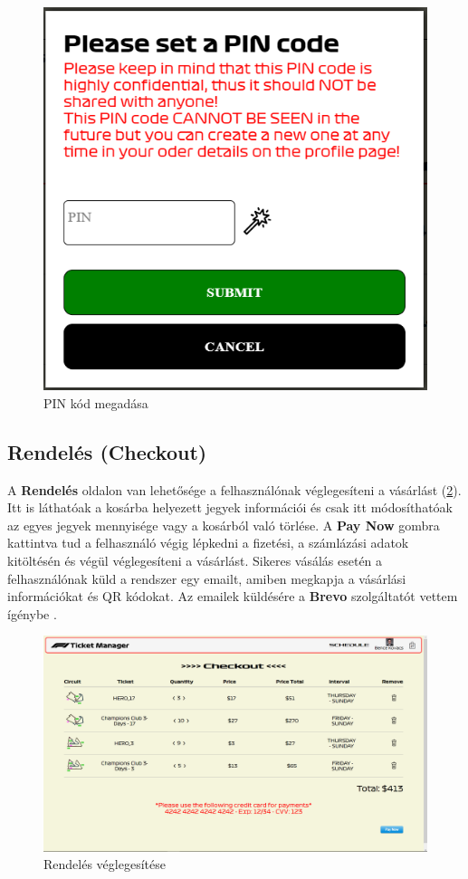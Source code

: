 \begin{figure}[!h]
	\centering
	\includegraphics[scale=0.4]{images/pinPopup}
	\caption{PIN kód megadása}
	\label{abra:pinPopup}
\end{figure}
\pagebreak

\subsection {Rendelés (Checkout)}

A \textbf{Rendelés} oldalon van lehetősége a felhasználónak véglegesíteni a vásárlást (\ref{abra:checkout}). Itt is láthatóak a kosárba helyezett jegyek információi és csak itt módosíthatóak az egyes jegyek mennyisége vagy a kosárból való törlése. A \textbf{Pay Now} gombra kattintva tud a felhasználó végig lépkedni a fizetési, a számlázási adatok kitöltésén és végül véglegesíteni a vásárlást. Sikeres vásálás esetén a felhasználónak küld a rendszer egy emailt, amiben megkapja a vásárlási információkat és QR kódokat. Az emailek küldésére a \textbf{Brevo} szolgáltatót vettem ígénybe \cite{Brevo}.

\begin{figure}[!h]
	\centering
	\includegraphics[scale=0.2]{images/checkout}
	\caption{Rendelés véglegesítése}
	\label{abra:checkout}
\end{figure}

